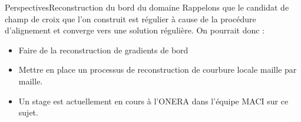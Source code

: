 \documentclass[compress,10pt,aspectratio=169]{beamer}
\begin{document}
\begin{frame}{Perspectives}{Reconstruction du bord du domaine}
\small
Rappelons que le candidat de champ de croix que l'on construit est régulier à cause de la procédure d'alignement et converge vers une solution régulière. On pourrait donc :\\\vspace{0.3cm}
    \begin{itemize}
\item Faire de la reconstruction de gradients de bord\\\vspace{0.3cm}
\item Mettre en place un processus de reconstruction de courbure locale maille par maille.\\\vspace{0.3cm}
\item Un stage est actuellement en cours à l'ONERA dans l'équipe MACI sur ce sujet.
    \end{itemize}
\end{frame}






\end{document}
